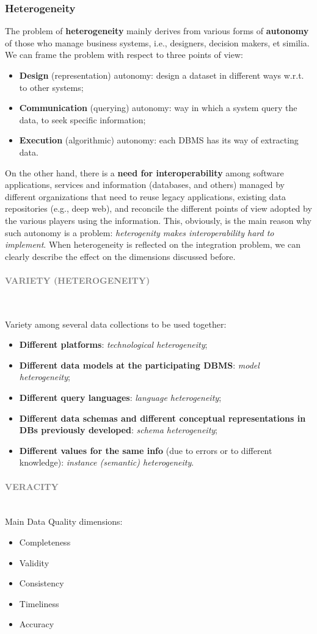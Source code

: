 \documentclass[10pt,a4paper]{article}
\newcommand{\myparagraph}[1]{\paragraph{\normalsize{\textcolor{gray}{\uppercase{\textbf{#1}}}} }\mbox{} \vspace{0.5em}\\}
\begin{document}
\subsubsection{Heterogeneity}
\begin{justify}
The problem of \textbf{heterogeneity} mainly derives from various forms of \textbf{autonomy} of those who manage business systems, i.e., designers, decision makers, et similia. We can frame the problem with respect to three points of view:
\begin{itemize}
	\item \textbf{Design} (representation) autonomy: design a dataset in different ways w.r.t. to other systems;
	\item \textbf{Communication} (querying) autonomy: way in which a system query the data, to seek specific information;
	\item \textbf{Execution} (algorithmic) autonomy: each DBMS has its way of extracting data.
\end{itemize}
On the other hand, there is a \textbf{need for interoperability} among software applications, services and information (databases, and others) managed by different organizations that need to reuse legacy applications, existing data repositories (e.g., deep web), and reconcile the different points of view adopted by the various players using the information. This, obviously, is the main reason why such autonomy is a problem: \textit{heterogenity makes interoperability hard to implement}.
\linebreak
When heterogeneity is reflected on the integration problem, we can clearly describe the effect on the dimensions discussed before.
\end{justify}
\myparagraph{VARIETY (heterogeneity)}
\begin{justify}
Variety among several data collections to be used together:
\begin{itemize}
	\item \textbf{Different platforms}: \textit{technological heterogeneity};
	\item \textbf{Different data models at the participating DBMS}: \textit{model heterogeneity};
	\item \textbf{Different query languages}: \textit{language heterogeneity};
	\item \textbf{Different data schemas and different conceptual representations in DBs previously developed}: \textit{schema heterogeneity};
	\item \textbf{Different values for the same info} (due to errors or to different knowledge): \textit{instance (semantic) heterogeneity}.
\end{itemize}
\myparagraph{VERACITY}
Main Data Quality dimensions:
\begin{itemize}
	\item Completeness
	\item Validity
	\item Consistency
	\item Timeliness
	\item Accuracy
\end{itemize}
\end{justify}
\end{document}
